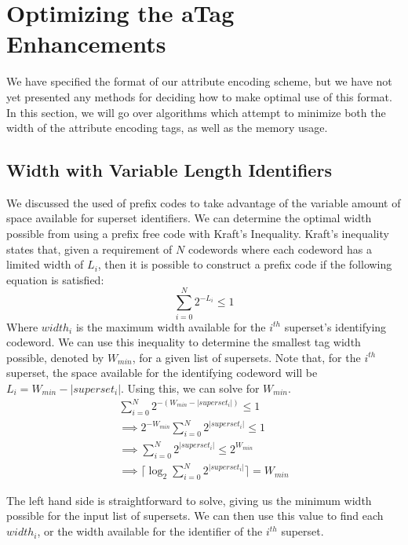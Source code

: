 \section{Optimizing the aTag Enhancements}
We have specified the format of our attribute encoding scheme, but we have not yet presented any methods for deciding how to make optimal use of this format. In this section, we will go over algorithms which attempt to minimize both the width of the attribute encoding tags, as well as the memory usage. 

\subsection{Width with Variable Length Identifiers}
We discussed the used of prefix codes to take advantage of the variable amount of space available for superset identifiers. We can determine the optimal width possible from using a prefix free code with Kraft's Inequality. Kraft's inequality states that, given a requirement of $N$ codewords where each codeword has a limited width of $L_i$, then it is possible to construct a prefix code if the following equation is satisfied:
$$ \sum_{i = 0}^{N}{2^{-L_i} \le 1} $$
Where $width_i$ is the maximum width available for the $i^{th}$ superset's identifying codeword. We can use this inequality to determine the smallest tag width possible, denoted by $W_{min}$, for a given list of supersets. Note that, for the $i^{th}$ superset, the space available for the identifying codeword will be $L_i = W_{min} - |superset_i|$. Using this, we can solve for $W_{min}$.\\

\begin{equation} \label{eq1}
 \begin{split}
  \sum_{i = 0}^{N}{2^{-(W_{min} - |superset_i|)}}   \le  1 \\
  \implies 2^{-W_{min}} \sum_{i = 0}^{N}{2^{|superset_i|}}   \le  1 \\
  \implies  \sum_{i = 0}^{N}{2^{|superset_i|}}   \le  2^{W_{min}} \\
 \implies   \lceil\log_2{\sum_{i = 0}^{N}{2^{|superset_i|}}}\rceil  =  W_{min}
\end{split}
 \end{equation}
 
 The left hand side is straightforward to solve, giving us the minimum width possible for the input list of supersets. We can then use this value to find each $width_i$, or the width available for the identifier of the $i^{th}$ superset.
 
